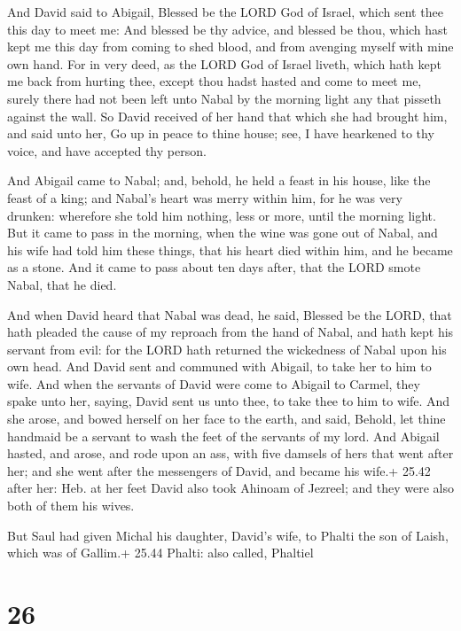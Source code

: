  And David said to Abigail, Blessed be the LORD God of
Israel, which sent thee this day to meet me:  And blessed
be thy advice, and blessed be thou, which hast kept me this day from
coming to shed blood, and from avenging myself with mine own hand.
 For in very deed, as the LORD God of Israel liveth, which
hath kept me back from hurting thee, except thou hadst hasted and come
to meet me, surely there had not been left unto Nabal by the morning
light any that pisseth against the wall.  So David received
of her hand that which she had brought him, and said unto her, Go up in
peace to thine house; see, I have hearkened to thy voice, and have
accepted thy person.

 And Abigail came to Nabal; and, behold, he held a feast
in his house, like the feast of a king; and Nabal's heart was merry
within him, for he was very drunken: wherefore she told him nothing,
less or more, until the morning light.  But it came to pass
in the morning, when the wine was gone out of Nabal, and his wife had
told him these things, that his heart died within him, and he became as
a stone.  And it came to pass about ten days after, that
the LORD smote Nabal, that he died.

 And when David heard that Nabal was dead, he said,
Blessed be the LORD, that hath pleaded the cause of my reproach from the
hand of Nabal, and hath kept his servant from evil: for the LORD hath
returned the wickedness of Nabal upon his own head. And David sent and
communed with Abigail, to take her to him to wife.  And
when the servants of David were come to Abigail to Carmel, they spake
unto her, saying, David sent us unto thee, to take thee to him to wife.
 And she arose, and bowed herself on her face to the earth,
and said, Behold, let thine handmaid be a servant to wash the feet of
the servants of my lord.  And Abigail hasted, and arose,
and rode upon an ass, with five damsels of hers that went after her; and
she went after the messengers of David, and became his wife.+ 25.42
after her: Heb. at her feet  David also took Ahinoam of
Jezreel; and they were also both of them his wives.

 But Saul had given Michal his daughter, David's wife, to
Phalti the son of Laish, which was of Gallim.+ 25.44 Phalti: also
called, Phaltiel

\hypertarget{section-25}{%
\section{26}\label{section-25}}

